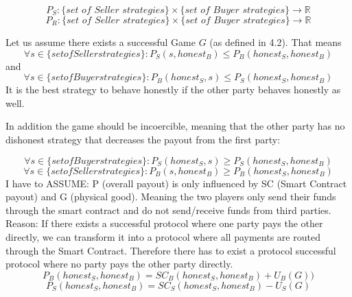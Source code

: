\documentclass{cacthesis}
\begin{document}
\[P_S : \{ \textit{set of Seller strategies}\} \times \{ \textit{set of Buyer strategies}\} \to \mathbb{R}\]
\[P_R : \{ \textit{set of Seller strategies}\} \times \{ \textit{set of Buyer strategies}\} \to \mathbb{R}\]

Let us assume there exists a successful Game $G$ (as defined in 4.2). That means
\begin{equation}
    \forall s \in \{set of Seller strategies\}: P_S(s, honest_B) \leq P_B(honest_S,honest_B)
\end{equation}
and
\begin{equation}
    \forall s \in \{set of Buyer strategies\}: P_B(honest_S, s) \leq P_S(honest_S,honest_B)
\end{equation}
It is the best strategy to behave honestly if the other party behaves honestly as well.\newline


In addition the game should be incoercible, meaning that the other party has no dishonest strategy that decreases the payout from the first party:

\begin{equation}
    \forall s \in \{set of Buyer strategies\}: P_S(honest_S, s) \geq P_S(honest_S,honest_B)
\end{equation}
\begin{equation}
    \forall s \in \{set of Seller strategies\}: P_B(s, honest_B) \geq P_B(honest_S,honest_B)
\end{equation}
I have to ASSUME: P (overall payout) is only influenced by SC (Smart Contract payout) and G (physical good). Meaning the two players only send their funds through the smart contract and do not send/receive funds from third parties.\newline
Reason: If there exists a successful protocol where one party pays the other directly, we can transform it into a protocol where all payments are routed through the Smart Contract. Therefore there has to exist a protocol successful protocol where no party pays the other party directly.
\begin{equation}
    P_B(honest_S,honest_B) = SC_B(honest_S, honest_B) + U_B(G))
\end{equation} 
\begin{equation}
    P_S(honest_S,honest_B) = SC_S(honest_S, honest_B) - U_S(G) 
\end{equation}
\end{document}
